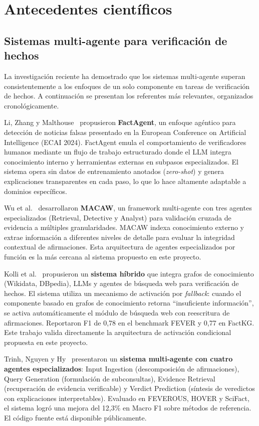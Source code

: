 \section{Antecedentes científicos}

\subsection{Sistemas multi-agente para verificación de hechos}

La investigación reciente ha demostrado que los sistemas multi-agente superan consistentemente a los enfoques de un solo componente en tareas de verificación de hechos. A continuación se presentan los referentes más relevantes, organizados cronológicamente.

Li, Zhang y Malthouse~\cite{Li2024} propusieron \textbf{FactAgent}, un enfoque agéntico para detección de noticias falsas presentado en la European Conference on Artificial Intelligence (ECAI 2024). FactAgent emula el comportamiento de verificadores humanos mediante un flujo de trabajo estructurado donde el LLM integra conocimiento interno y herramientas externas en subpasos especializados. El sistema opera sin datos de entrenamiento anotados (\textit{zero-shot}) y genera explicaciones transparentes en cada paso, lo que lo hace altamente adaptable a dominios específicos.

Wu et al.~\cite{Wu2024} desarrollaron \textbf{MACAW}, un framework multi-agente con tres agentes especializados (Retrieval, Detective y Analyst) para validación cruzada de evidencia a múltiples granularidades. MACAW indexa conocimiento externo y extrae información a diferentes niveles de detalle para evaluar la integridad contextual de afirmaciones. Esta arquitectura de agentes especializados por función es la más cercana al sistema propuesto en este proyecto.

Kolli et al.~\cite{Kolli2025} propusieron un \textbf{sistema híbrido} que integra grafos de conocimiento (Wikidata, DBpedia), LLMs y agentes de búsqueda web para verificación de hechos. El sistema utiliza un mecanismo de activación por \textit{fallback}: cuando el componente basado en grafos de conocimiento retorna ``insuficiente información'', se activa automáticamente el módulo de búsqueda web con reescritura de afirmaciones. Reportaron F1 de 0,78 en el benchmark FEVER y 0,77 en FactKG. Este trabajo valida directamente la arquitectura de activación condicional propuesta en este proyecto.

Trinh, Nguyen y Hy~\cite{Trinh2025} presentaron un \textbf{sistema multi-agente con cuatro agentes especializados}: Input Ingestion (descomposición de afirmaciones), Query Generation (formulación de subconsultas), Evidence Retrieval (recuperación de evidencia verificable) y Verdict Prediction (síntesis de veredictos con explicaciones interpretables). Evaluado en FEVEROUS, HOVER y SciFact, el sistema logró una mejora del 12,3\% en Macro F1 sobre métodos de referencia. El código fuente está disponible públicamente.


